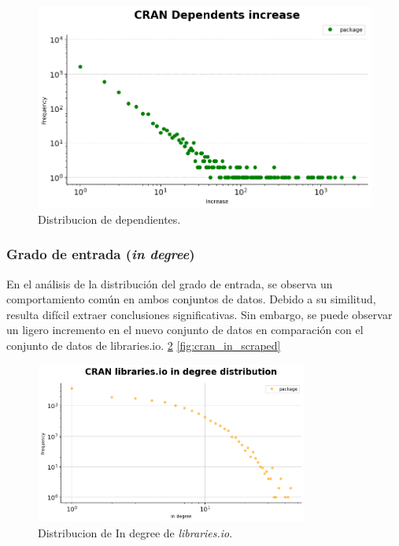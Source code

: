 \begin{figure}[h!]
    \begin{center}
        \includegraphics[width=1\textwidth]{img/cran/dependents_dist.png}
        \caption{Distribucion de dependientes.}
        \label{fig:cran_dependents_dist}
    \end{center}
\end{figure}

\subsubsection{Grado de entrada (\textit{in degree})}


En el análisis de la distribución del grado de entrada, se observa un comportamiento común
en ambos conjuntos de datos. Debido a su similitud, resulta difícil extraer conclusiones
significativas. Sin embargo, se puede observar un ligero incremento en el nuevo conjunto de
datos en comparación con el conjunto de datos de libraries.io. \ref{fig:cran_in_lib} \ref{fig:cran_in_scraped}

\begin{figure}[h!]
    \begin{center}
        \includegraphics[width=0.8\textwidth]{img/cran/ind_lib.png}
        \caption{Distribucion de In degree de \textit{libraries.io}.}
        \label{fig:cran_in_lib}
    \end{center}
\end{figure}

